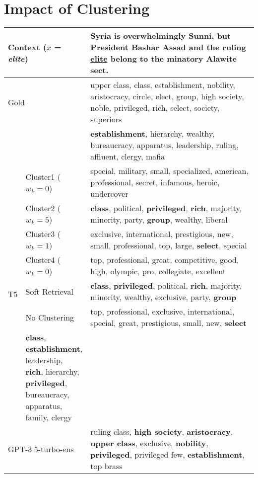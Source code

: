 \documentclass[11pt]{article}
\newcommand{\ex}[1]{\textit{#1}\xspace}
\begin{document}
\section{Impact of Clustering}\label{ablation_study_appendix}
\begin{table*}[t!]
\begin{center}
\begin{adjustbox}{max width=\textwidth}
\begin{tabular}{m{0.02\linewidth}m{0.18\linewidth}m{0.85\linewidth}}
\toprule
\multicolumn{2}{l}{ Context ($x$ = \ex{elite}) }&Syria is overwhelmingly Sunni, but President Bashar Assad and the ruling \underline{elite} belong to the minatory Alawite sect.\\\midrule
\multicolumn{2}{l}{Gold} &upper class, class, establishment, nobility, aristocracy, circle, elect, group, high society, noble, privileged, rich, select, society, superiors
\\\midrule
\multicolumn{2}{l}{\citet{wada-etal-2022-unsupervised}} &\textbf{establishment}, hierarchy, wealthy, bureaucracy, apparatus, leadership, ruling, affluent, clergy, mafia\\\midrule
\multirow{7}{*}{T5}&Cluster1 ($w_k=0$) &special, military, small, specialized, american, professional, secret, infamous, heroic, undercover\\
&Cluster2 ($w_k=5$)&\textbf{class}, political, \textbf{privileged}, \textbf{rich}, majority, minority, party, \textbf{group}, wealthy, liberal\\
&Cluster3 ($w_k=1$)&exclusive, international, prestigious, new, small, professional, top, large, \textbf{select}, special\\
&Cluster4 ($w_k=0$)&top, professional, great, competitive, good, high, olympic, pro, collegiate, excellent\\
\cmidrule{2-3}
&\multirow{1}{*}{Soft Retrieval} &\textbf{class}, \textbf{privileged}, political, \textbf{rich}, majority, minority, wealthy, exclusive, party, \textbf{group}\\
&\multirow{1}{*}{No Clustering} &top, professional, exclusive, international, special, great, prestigious, small, new, \textbf{select}\\\midrule
\multicolumn{2}{l}{OURS} &\textbf{class}, \textbf{establishment}, leadership, \textbf{rich}, hierarchy, \textbf{privileged}, bureaucracy, apparatus, family, clergy\\
\multicolumn{2}{l}{GPT-3.5-turbo-ens}&
ruling class, \textbf{high society}, \textbf{aristocracy}, \textbf{upper class}, exclusive, \textbf{nobility}, \textbf{privileged}, privileged few, \textbf{establishment}, top brass\\\midrule\midrule


\end{tabular}
\end{adjustbox}
\end{center}
\end{table*}
\end{document}

